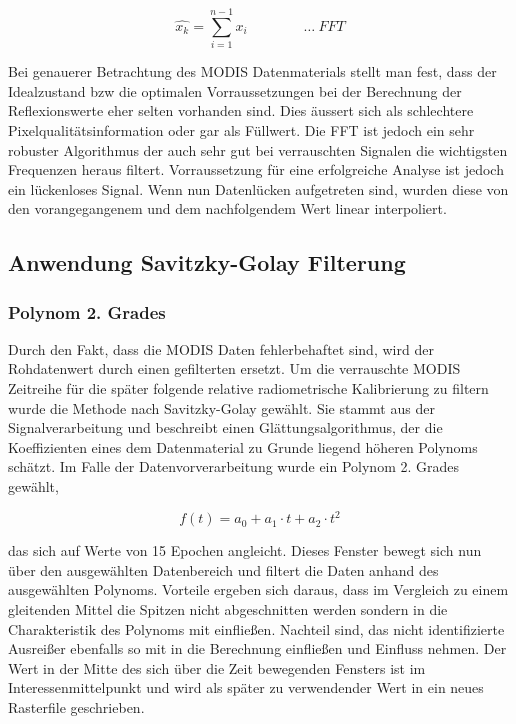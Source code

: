 \documentclass[11pt]{report}
\begin{document}
\begin{equation}
\hat{x_k}=\sum_{i=1}^{n-1} x_i \qquad\qquad \dots \ FFT
\end{equation}



Bei genauerer Betrachtung des MODIS Datenmaterials stellt man fest, dass der Idealzustand bzw die optimalen Vorraussetzungen bei der Berechnung der Reflexionswerte eher selten vorhanden sind. Dies äussert sich als schlechtere Pixelqualitätsinformation oder gar als Füllwert. Die FFT ist jedoch ein sehr robuster Algorithmus der auch sehr gut bei verrauschten Signalen die wichtigsten Frequenzen heraus filtert. Vorraussetzung für eine erfolgreiche Analyse ist jedoch ein lückenloses Signal. Wenn nun Datenlücken aufgetreten sind, wurden diese von den vorangegangenem und dem nachfolgendem Wert linear interpoliert.


\subsection{Anwendung Savitzky-Golay Filterung}

\subsubsection{Polynom 2. Grades}
Durch den Fakt, dass die MODIS Daten fehlerbehaftet sind, wird der Rohdatenwert durch einen gefilterten ersetzt. Um die verrauschte MODIS Zeitreihe für die später folgende relative radiometrische Kalibrierung zu filtern wurde die Methode nach Savitzky-Golay gewählt. Sie stammt aus der Signalverarbeitung und beschreibt einen Glättungsalgorithmus, der die Koeffizienten eines dem Datenmaterial zu Grunde liegend höheren Polynoms schätzt. 
Im Falle der Datenvorverarbeitung wurde ein Polynom 2. Grades gewählt, 

\begin{equation}
f(t) = a_0+a_1 \cdot t+a_2 \cdot t^2
\end{equation}

das sich auf Werte von 15 Epochen angleicht. Dieses Fenster bewegt sich nun über den ausgewählten Datenbereich und filtert die Daten anhand des ausgewählten Polynoms. Vorteile ergeben sich daraus, dass im Vergleich zu einem gleitenden Mittel die Spitzen nicht abgeschnitten werden sondern in die Charakteristik des Polynoms mit einfließen. Nachteil sind, das nicht identifizierte Ausreißer ebenfalls so mit in die Berechnung einfließen und Einfluss nehmen. Der Wert in der Mitte des sich über die Zeit bewegenden Fensters ist im Interessenmittelpunkt und wird als später zu verwendender Wert in ein neues Rasterfile geschrieben.
\end{document}
